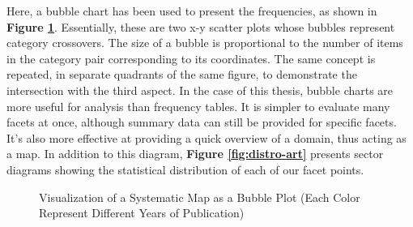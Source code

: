             Here, a bubble chart has been used to present the frequencies, as shown in \textbf{Figure \ref{fig:viz-smb}}. Essentially, these are two x-y scatter plots whose bubbles represent category crossovers. The size of a bubble is proportional to the number of items in the category pair corresponding to its coordinates. The same concept is repeated, in separate quadrants of the same figure, to demonstrate the intersection with the third aspect. In the case of this thesis, bubble charts are more useful for analysis than frequency tables. It is simpler to evaluate many facets at once, although summary data can still be provided for specific facets. It's also more effective at providing a quick overview of a domain, thus acting as a map. In addition to this diagram, \textbf{Figure \ref{fig:distro-art}} presents sector diagrams showing the statistical distribution of each of our facet points.

            
            \begin{figure}[h]
            \centering
            \caption{\label{fig:viz-smb}  Visualization of a Systematic Map as a Bubble Plot (Each Color Represent Different Years of Publication)}
            \end{figure}

